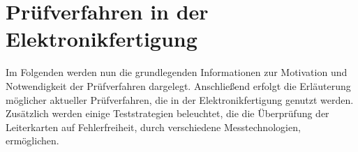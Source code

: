 \section{Prüfverfahren in der Elektronikfertigung}
    Im Folgenden werden nun die grundlegenden Informationen zur Motivation und Notwendigkeit der Prüfverfahren dargelegt.
    Anschließend erfolgt die Erläuterung möglicher aktueller Prüfverfahren, die in der Elektronikfertigung genutzt werden.
    Zusätzlich werden einige Teststrategien beleuchtet, die die Überprüfung der Leiterkarten auf Fehlerfreiheit, durch verschiedene Messtechnologien, ermöglichen.